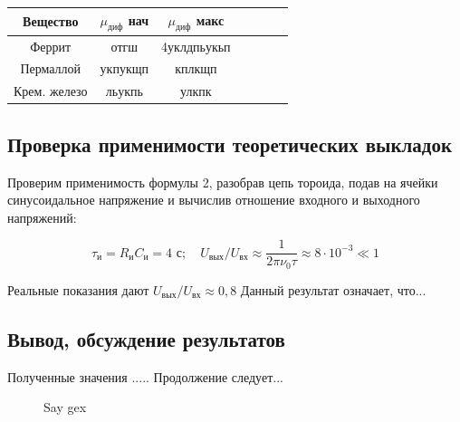 \documentclass[a4paper,12pt]{article} %
\def\picdir{./}
\newcommand{\svg}[3][0.7] {
  \begin{figure}[h]
    \begin{center}
      \fontsize{7}{8}\selectfont
      
      \caption{#3}
    \end{center}
  \end{figure}
}
\begin{document}
\begin{enumerate}
  \begin{table}[H]
    \centering
    \begin{tabular}{|c|c|c|c|c|c|c|}
      \hline
      Вещество  &	$\mu_{диф}$ нач  & $\mu_{диф}$ макс  \\ \hline
      Феррит       & отгш          & 4уклдпьукьп        \\ \hline
      Пермаллой    & укпукщп         & кплкщп         \\ \hline
      Крем. железо & льукпь           & улкпк        \\ \hline
    \end{tabular}
  \end{table}




  \subsection{Проверка применимости теоретических выкладок}

  Проверим применимость формулы 2, разобрав цепь тороида, подав на ячейки синусоидальное напряжение и вычислив отношение входного и выходного напряжений: 

  \begin{equation}
    \tau_{и} = R_{и}C_{и} = 4 \text{ с}; \quad U_{вых}/U_{вх} \approx \frac{1}{2\pi\nu_{0}\tau} \approx 8\cdot 10^{-3} \ll 1
  \end{equation}

  Реальные показания дают $U_{вых}/U_{вх}\approx 0,8$ Данный результат означает, что...

  \subsection{Вывод, обсуждение результатов}

  Полученные значения ..... Продолжение следует...

\end{enumerate}

\svg{fesi.svg}{Say gex}
\end{document}
